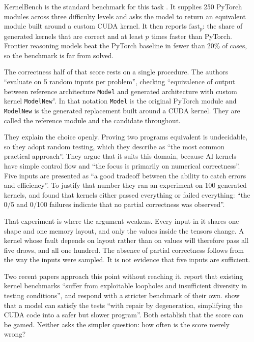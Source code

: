 \documentclass[12pt]{article}
\begin{document}
KernelBench is the standard benchmark for this task
\citep{ouyang2025kernelbench}. It supplies 250 PyTorch modules across three
difficulty levels and asks the model to return an equivalent module built
around a custom CUDA kernel. It then reports $\mathrm{fast}_p$: the share of
generated kernels that are correct and at least $p$ times faster than PyTorch.
Frontier reasoning models beat the PyTorch baseline in fewer than 20\% of
cases, so the benchmark is far from solved.

The correctness half of that score rests on a single procedure. The authors
``evaluate on 5 random inputs per problem'', checking ``equivalence of output
between reference architecture \texttt{Model} and generated architecture with
custom kernel \texttt{ModelNew}''. In that notation \texttt{Model} is the
original PyTorch module and \texttt{ModelNew} is the generated replacement built
around a CUDA kernel. They are called the reference module and the candidate
throughout.

They explain the choice openly. Proving two programs equivalent is undecidable,
so they adopt random testing, which they describe as ``the most common
practical approach''. They argue that it suits this domain, because AI kernels
have simple control flow and ``the focus is primarily on numerical
correctness''. Five inputs are presented as ``a good tradeoff between the
ability to catch errors and efficiency''. To justify that number they ran an
experiment on 100 generated kernels, and found that kernels either passed
everything or failed everything: ``the 0/5 and 0/100 failures indicate that no
partial correctness was observed''.

That experiment is where the argument weakens. Every input in it shares one
shape and one memory layout, and only the values inside the tensors change. A
kernel whose fault depends on layout rather than on values will therefore pass
all five draws, and all one hundred. The absence of partial correctness follows
from the way the inputs were sampled. It is not evidence that five inputs are
sufficient.

Two recent papers approach this point without reaching it.
\citet{lange2025robustkbench} report that existing kernel benchmarks ``suffer
from exploitable loopholes and insufficient diversity in testing conditions'',
and respond with a stricter benchmark of their own. \citet{li2026cudabeaver}
show that a model can satisfy the tests ``with repair by degeneration,
simplifying the CUDA code into a safer but slower program''. Both establish
that the score can be gamed. Neither asks the simpler question: how often is
the score merely wrong?
\end{document}
